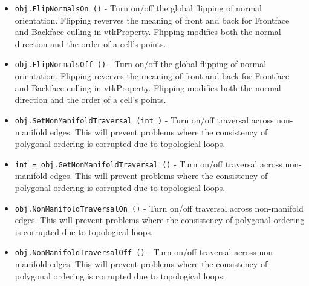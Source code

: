 \begin{itemize}
\item  \verb|obj.FlipNormalsOn ()| -  Turn on/off the global flipping of normal orientation. Flipping
 reverves the meaning of front and back for Frontface and Backface
 culling in vtkProperty.  Flipping modifies both the normal
 direction and the order of a cell's points.

\item  \verb|obj.FlipNormalsOff ()| -  Turn on/off the global flipping of normal orientation. Flipping
 reverves the meaning of front and back for Frontface and Backface
 culling in vtkProperty.  Flipping modifies both the normal
 direction and the order of a cell's points.

\item  \verb|obj.SetNonManifoldTraversal (int )| -  Turn on/off traversal across non-manifold edges. This will prevent
 problems where the consistency of polygonal ordering is corrupted due
 to topological loops.

\item  \verb|int = obj.GetNonManifoldTraversal ()| -  Turn on/off traversal across non-manifold edges. This will prevent
 problems where the consistency of polygonal ordering is corrupted due
 to topological loops.

\item  \verb|obj.NonManifoldTraversalOn ()| -  Turn on/off traversal across non-manifold edges. This will prevent
 problems where the consistency of polygonal ordering is corrupted due
 to topological loops.

\item  \verb|obj.NonManifoldTraversalOff ()| -  Turn on/off traversal across non-manifold edges. This will prevent
 problems where the consistency of polygonal ordering is corrupted due
 to topological loops.

\end{itemize}
